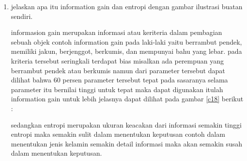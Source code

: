 \begin{enumerate}
\item jelaskan apa itu information gain dan entropi dengan gambar ilustrasi buatan sendiri.\par
informasion gain merupakan informasi atau keriteria dalam pembagian sebuah objek contoh information gain pada laki-laki yaitu berrambut pendek, memiliki jakun, berjenggot, berkumis, dan mempunyai bahu yang lebar. pada kriteria tersebut seringkali terdapat bias misalkan ada perempuan yang berrambut pendek atau berkumis namun dari parameter tersebut dapat dilihat bahwa 60 persen parameter tersebut tepat pada sasaranya selama parameter itu bernilai tinggi untuk tepat maka dapat digunakan itulah information gain untuk lebih jelasnya dapat dilihat pada gambar \ref{c18}  berikut :\par
sedangkan entropi merupakan ukuran keacakan dari informasi semakin tinggi entropi maka semakin sulit dalam menentukan keputusan contoh dalam menentukan jenis kelamin semakin detail informasi maka akan semakin susah dalam menentukan keputusan.
\end{enumerate}


